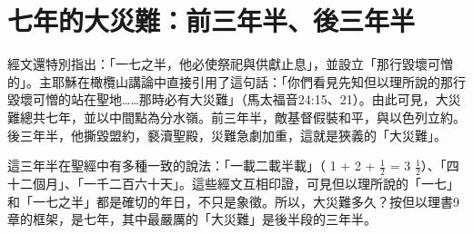 \section*{七年的大災難：前三年半、後三年半}
經文還特別指出：「一七之半，他必使祭祀與供獻止息」，並設立「那行毀壞可憎的」。主耶穌在橄欖山講論中直接引用了這句話：「你們看見先知但以理所說的那行毀壞可憎的站在聖地……那時必有大災難」（馬太福音24:15、21）。由此可見，大災難總共七年，並以中間點為分水嶺。前三年半，敵基督假裝和平，與以色列立約。後三年半，他撕毀盟約，褻瀆聖殿，災難急劇加重，這就是狹義的「大災難」。

這三年半在聖經中有多種一致的說法：「一載二載半載」（ 1 + 2 + $\frac{1}{2}$ = 3 $\frac{1}{2}$）、「四十二個月」、「一千二百六十天」。這些經文互相印證，可見但以理所說的「一七」和「一七之半」都是確切的年日，不只是象徵。所以，大災難多久？按但以理書9章的框架，是七年，其中最嚴厲的「大災難」是後半段的三年半。
